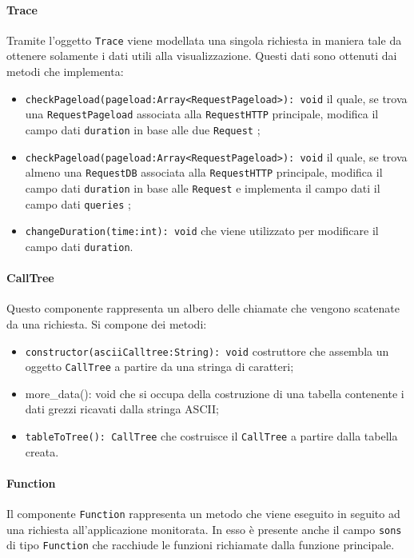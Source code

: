 \paragraph{Trace} \Spazio
Tramite l'oggetto \texttt{Trace} viene modellata una singola richiesta in maniera tale da ottenere solamente i dati utili alla visualizzazione. Questi dati sono ottenuti dai metodi che implementa:
\begin{itemize}
	\item \texttt{checkPageload(pageload:Array<RequestPageload>): void} il quale, se trova una \texttt{RequestPageload} associata alla \texttt{RequestHTTP} principale, modifica il campo dati \texttt{duration} in base alle due \texttt{Request} ;
	\item \texttt{checkPageload(pageload:Array<RequestPageload>): void} il quale, se trova almeno una \texttt{RequestDB} associata alla \texttt{RequestHTTP} principale, modifica il campo dati \texttt{duration} in base alle \texttt{Request} e implementa il campo dati il campo dati \texttt{queries} ;
	\item \texttt{changeDuration(time:int): void} che viene utilizzato per modificare il campo dati \texttt{duration}.
\end{itemize} 

\paragraph{CallTree} \Spazio
Questo componente rappresenta un albero delle chiamate che vengono scatenate da una richiesta. Si compone dei metodi:
\begin{itemize}
	\item \texttt{constructor(asciiCalltree:String): void} costruttore che assembla un oggetto \texttt{CallTree} a partire da una stringa di caratteri;
	\item more\_data(): void che si occupa della costruzione di una tabella contenente i dati grezzi ricavati dalla stringa ASCII;
	\item \texttt{tableToTree(): CallTree} che costruisce il \texttt{CallTree} a partire dalla tabella creata.
\end{itemize}

\paragraph{Function} \Spazio
Il componente \texttt{Function} rappresenta un metodo che viene eseguito in seguito ad una richiesta all'applicazione monitorata. In esso è presente anche il campo \texttt{sons} di tipo \texttt{Function} che racchiude le funzioni richiamate dalla funzione principale.


